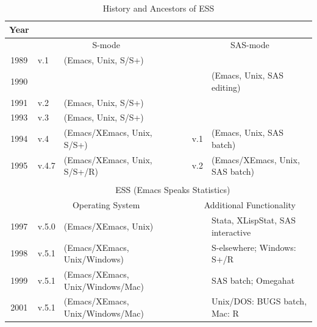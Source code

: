 \documentclass{article}
\newif\ifdraft
\newcommand{\emptyfig}{
\hspace*{42pt}\rule{324pt}{.25pt}\\
\hspace*{42pt}\rule{.25pt}{10pc}
\rule{316pt}{.25pt}
\rule{.25pt}{10pc}}
\begin{document}

\begin{table}[tbp]
  \centering
  \begin{tabular}{c ll c ll}
\hline
    Year  \\ 
\hline
         & \multicolumn{2}{c}{S-mode}       && \multicolumn{2}{c}{SAS-mode} \\ 
\cline{2-3} \cline{5-6}
    1989 & v.1 & (Emacs, Unix, S/S+)        &&  \\
    1990 &     &                            &&     & (Emacs, Unix, SAS editing) \\
    1991 & v.2 & (Emacs, Unix, S/S+)        && \\
    1993 & v.3 & (Emacs, Unix, S/S+)        && \\
    1994 & v.4 & (Emacs/XEmacs, Unix, S/S+) && v.1  & (Emacs, Unix, SAS batch) \\
    1995 & v.4.7 & (Emacs/XEmacs, Unix, S/S+/R) && v.2 & (Emacs/XEmacs, Unix, SAS batch) \\
    \cline{2-6}\\[-3.5ex]
    \cline{2-6}
         & \multicolumn{5}{c}{ESS (Emacs Speaks Statistics)} \\
    \cline{2-6} 
         &\multicolumn{2}{c}{Operating System} &&\multicolumn{2}{c}{Additional Functionality}\\
\cline{2-3} \cline{5-6}
    1997 & v.5.0 & (Emacs/XEmacs, Unix)         &&&  Stata, XLispStat, SAS interactive \\
    1998 & v.5.1 & (Emacs/XEmacs, Unix/Windows) &&&  S-elsewhere; Windows: S+/R\\
    1999 & v.5.1 & (Emacs/XEmacs, Unix/Windows/Mac) &&& SAS batch; Omegahat \\
    2001 & v.5.1 & (Emacs/XEmacs, Unix/Windows/Mac) &&& Unix/DOS: BUGS batch, Mac: R \\
\hline
  \end{tabular}
  \caption{History and Ancestors of ESS}
  \label{tab:timeline}
\end{table}
\end{document}
